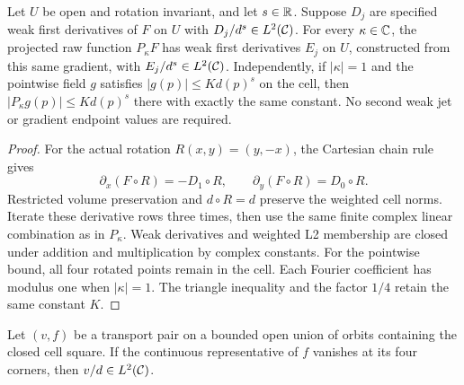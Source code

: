 \begin{lemma}
\label{lem:weighted-quarter-projections}
\leanok
Let $U$ be open and rotation invariant, and let $s\in\mathbb{R}$.
Suppose $D_j$ are specified weak first derivatives of $F$ on $U$ with
$D_j/d^s\in L^2(\mathcal{C})$.
For every $\kappa\in\mathbb{C}$, the projected raw function $P_\kappa F$ has
weak first derivatives $E_j$ on $U$, constructed from this same gradient,
with $E_j/d^s\in L^2(\mathcal{C})$.
Independently, if $|\kappa|=1$ and the pointwise field $g$ satisfies
$|g(p)|\le Kd(p)^s$ on the cell, then
$|P_\kappa g(p)|\le Kd(p)^s$ there with exactly the same constant.
No second weak jet or gradient endpoint values are required.
\end{lemma}

\begin{proof}
\leanok
For the actual rotation $R(x,y)=(y,-x)$, the Cartesian chain rule gives
\[
 \partial_x(F\circ R)=-D_1\circ R,\qquad
 \partial_y(F\circ R)=D_0\circ R.
\]
Restricted volume preservation and $d\circ R=d$ preserve the weighted cell
norms. Iterate these derivative rows three times, then use the same finite
complex linear combination as in $P_\kappa$.
Weak derivatives and weighted L2 membership are closed under addition
and multiplication by complex constants.
For the pointwise bound, all four rotated points remain in the cell.
Each Fourier coefficient has modulus one when $|\kappa|=1$.
The triangle inequality and the factor $1/4$ retain the same constant $K$.
\end{proof}

\begin{lemma}
\label{lem:transport-first-gain-zero}
\leanok
Let $(v,f)$ be a transport pair on a bounded open union of orbits containing
the closed cell square. If the continuous representative of $f$ vanishes
at its four corners, then $v/d\in L^2(\mathcal{C})$.
\end{lemma}

